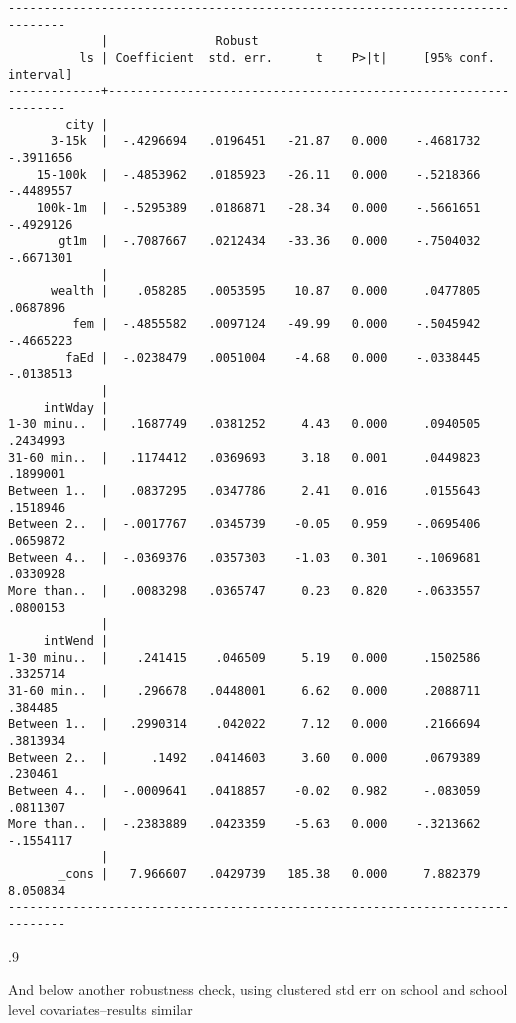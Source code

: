 \documentclass[10pt, letterpaper]{article}
\begin{document}
\begin{spacing}{1.4}
\begin{spacing}{.5}
\begin{scriptsize}
\begin{verbatim}
------------------------------------------------------------------------------
             |               Robust
          ls | Coefficient  std. err.      t    P>|t|     [95% conf. interval]
-------------+----------------------------------------------------------------
        city |
      3-15k  |  -.4296694   .0196451   -21.87   0.000    -.4681732   -.3911656
    15-100k  |  -.4853962   .0185923   -26.11   0.000    -.5218366   -.4489557
    100k-1m  |  -.5295389   .0186871   -28.34   0.000    -.5661651   -.4929126
       gt1m  |  -.7087667   .0212434   -33.36   0.000    -.7504032   -.6671301
             |
      wealth |    .058285   .0053595    10.87   0.000     .0477805    .0687896
         fem |  -.4855582   .0097124   -49.99   0.000    -.5045942   -.4665223
        faEd |  -.0238479   .0051004    -4.68   0.000    -.0338445   -.0138513
             |
     intWday |
1-30 minu..  |   .1687749   .0381252     4.43   0.000     .0940505    .2434993
31-60 min..  |   .1174412   .0369693     3.18   0.001     .0449823    .1899001
Between 1..  |   .0837295   .0347786     2.41   0.016     .0155643    .1518946
Between 2..  |  -.0017767   .0345739    -0.05   0.959    -.0695406    .0659872
Between 4..  |  -.0369376   .0357303    -1.03   0.301    -.1069681    .0330928
More than..  |   .0083298   .0365747     0.23   0.820    -.0633557    .0800153
             |
     intWend |
1-30 minu..  |    .241415    .046509     5.19   0.000     .1502586    .3325714
31-60 min..  |    .296678   .0448001     6.62   0.000     .2088711     .384485
Between 1..  |   .2990314    .042022     7.12   0.000     .2166694    .3813934
Between 2..  |      .1492   .0414603     3.60   0.000     .0679389     .230461
Between 4..  |  -.0009641   .0418857    -0.02   0.982     -.083059    .0811307
More than..  |  -.2383889   .0423359    -5.63   0.000    -.3213662   -.1554117
             |
       _cons |   7.966607   .0429739   185.38   0.000     7.882379    8.050834
------------------------------------------------------------------------------
\end{verbatim}
\end{scriptsize}
\end{spacing}{.9}



And below another robustness check, using clustered std err on school and school
level covariates--results similar
\begin{spacing}{.5}
\begin{scriptsize}
\begin{verbatim}


\end{verbatim}
\end{scriptsize}
\end{spacing}
\end{spacing}
\end{document}
